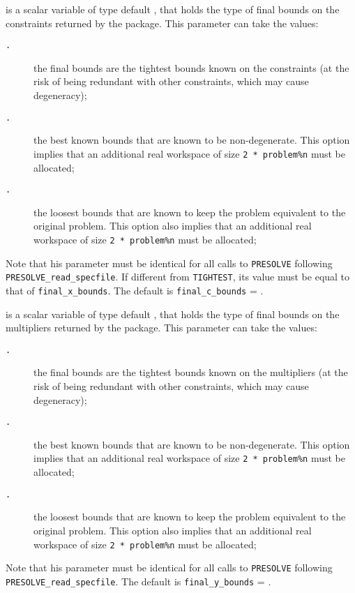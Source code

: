 \documentclass{galahad}
\newcommand{\packagename}{PRESOLVE}
\newcommand{\sym}{\tt\small}
\begin{document}
\begin{description}
 is a scalar variable of type default \integer, that
holds the type of final bounds on the constraints returned by 
the package.  This parameter can take the values:
\begin{description}
\item[\sym \galsymtightest.] the final bounds are the tightest bounds
                known on the constraints (at the risk of
                being redundant with other constraints,
                which may cause degeneracy);
\item[\sym \galsymnondegenerate.] the best known bounds that are known to
                      be non-degenerate. This option implies
                      that an additional real workspace of size
                      {\tt 2 * problem\%n} must be allocated;
\item[\sym \galsymloosest.] the loosest bounds that are known to
               keep the problem equivalent to the
               original problem. This option also 
               implies that an additional real workspace of size
               {\tt 2 * problem\%n} must be allocated;
\end{description}
Note that his parameter must be identical for all calls to 
{\tt \packagename} following {\tt \packagename\_read\_specfile}. 
If different from
{\tt TIGHTEST}, its value must be equal to that of {\tt final\_x\_bounds}.
The default is {\tt final\_c\_bounds} = {\sym \galsymtightest}.
         
 is a scalar variable of type default \integer, that
holds the type of final bounds on the multipliers returned by 
the package.  This parameter can take the values:
\begin{description}
\item[\sym \galsymtightest.] the final bounds are the tightest bounds
                known on the multipliers (at the risk of
                being redundant with other constraints,
                which may cause degeneracy);
\item[\sym \galsymnondegenerate.] the best known bounds that are known to
                      be non-degenerate. This option implies
                      that an additional real workspace of size
                      {\tt 2 * problem\%n} must be allocated;
\item[\sym \galsymloosest.] the loosest bounds that are known to
               keep the problem equivalent to the
               original problem. This option also 
               implies that an additional real workspace of size
               {\tt 2 * problem\%n} must be allocated;
\end{description}
Note that his parameter must be identical for all calls to 
{\tt \packagename} following {\tt \packagename\_read\_specfile}.
The default is {\tt final\_y\_bounds} = {\sym \galsymtightest}.
         

\end{description}
\end{document}
